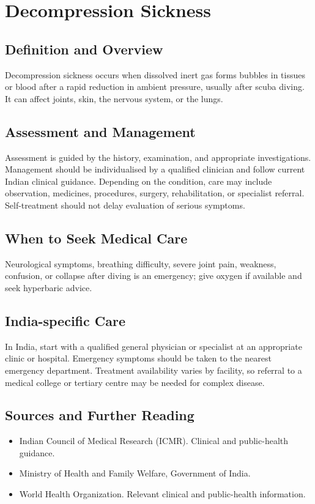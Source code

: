 \chapter{Decompression Sickness}

\section*{Definition and Overview}
Decompression sickness occurs when dissolved inert gas forms bubbles in tissues or blood after a rapid reduction in ambient pressure, usually after scuba diving. It can affect joints, skin, the nervous system, or the lungs.

\section*{Assessment and Management}
Assessment is guided by the history, examination, and appropriate investigations. Management should be individualised by a qualified clinician and follow current Indian clinical guidance. Depending on the condition, care may include observation, medicines, procedures, surgery, rehabilitation, or specialist referral. Self-treatment should not delay evaluation of serious symptoms.

\section*{When to Seek Medical Care}
Neurological symptoms, breathing difficulty, severe joint pain, weakness, confusion, or collapse after diving is an emergency; give oxygen if available and seek hyperbaric advice.

\section*{India-specific Care}
In India, start with a qualified general physician or specialist at an appropriate clinic or hospital. Emergency symptoms should be taken to the nearest emergency department. Treatment availability varies by facility, so referral to a medical college or tertiary centre may be needed for complex disease.

\section*{Sources and Further Reading}
\begin{itemize}
    \item Indian Council of Medical Research (ICMR). Clinical and public-health guidance.
    \item Ministry of Health and Family Welfare, Government of India.
    \item World Health Organization. Relevant clinical and public-health information.
\end{itemize}

